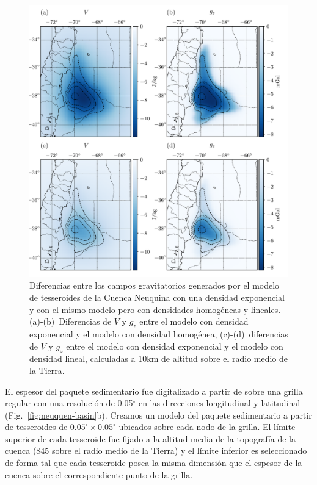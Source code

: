 \begin{figure}
\centering
\includegraphics[width=\linewidth]{figs/tesseroids-variable-density/neuquen-basin-diffs.pdf}
\caption{
    Diferencias entre los campos gravitatorios generados por el modelo de
    tesseroides de la Cuenca Neuquina con una densidad exponencial y con el
    mismo modelo pero con densidades homogéneas y lineales.
    \mbox{(a)-(b)}~Diferencias de $V$ y $g_z$ entre el modelo con densidad
    exponencial y el modelo con densidad homogénea,
    \mbox{(c)-(d)}~diferencias de $V$ y $g_z$ entre el modelo con densidad
    exponencial y el modelo con densidad lineal,
    calculadas a 10km de altitud sobre el radio medio de la Tierra.
}
\label{fig:neuquen-basin-diffs}
\end{figure}

El espesor del paquete sedimentario fue digitalizado a partir de
\citet{heine2007} sobre una grilla regular con una resolución de 0.05$^\circ$
en las direcciones longitudinal y latitudinal (Fig.~\ref{fig:neuquen-basin}b).
Creamos un modelo del paquete sedimentario a partir de tesseroides de
$0.05^\circ \times 0.05^\circ$ ubicados sobre cada nodo de la grilla.
El límite superior de cada tesseroide fue fijado a la altitud media de la
topografía de la cuenca (845\m{} sobre el radio medio de la Tierra) y el límite
inferior es seleccionado de forma tal que cada tesseroide posea la misma
dimensión que el espesor de la cuenca sobre el correspondiente punto de la
grilla.

